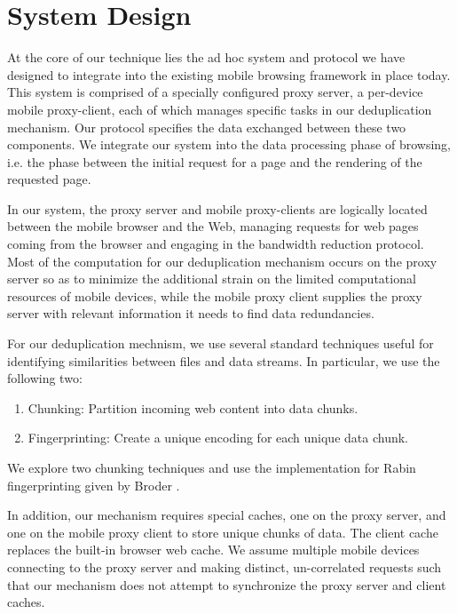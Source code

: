 \section{System Design}
\label{sec:sys_design}
At the core of our technique lies the ad hoc system and protocol we have designed to integrate into the existing mobile browsing framework in place today. This system is comprised of a specially configured proxy server, a per-device mobile proxy-client, each of which manages specific tasks in our deduplication mechanism. Our protocol specifies the data exchanged between these two components. We integrate our system into the data processing phase of browsing, i.e. the phase between the initial request for a page and the rendering of the requested page.

In our system, the proxy server and mobile proxy-clients are logically located between the mobile browser and the Web, managing requests for web pages coming from the browser and engaging in the bandwidth reduction protocol. Most of the computation for our deduplication mechanism occurs on the proxy server so as to minimize the additional strain on the limited computational resources of mobile devices, while the mobile proxy client supplies the proxy server with relevant information it needs to find data redundancies. 

For our deduplication mechnism, we use several standard techniques useful for identifying similarities between files and data streams. In particular, we use the following two: 
\begin{enumerate}
\item Chunking: Partition incoming web content into data chunks.
\item Fingerprinting: Create a unique encoding for each unique data chunk.
\end{enumerate}
We explore two chunking techniques and use the implementation for Rabin fingerprinting given by Broder \cite{broder}. 

In addition, our mechanism requires special caches, one on the proxy server, and one on the mobile proxy client to store unique chunks of data. The client cache replaces the built-in browser web cache. We assume multiple mobile devices connecting to the proxy server and making distinct, un-correlated requests such that our mechanism does not attempt to synchronize the proxy server and client caches.






